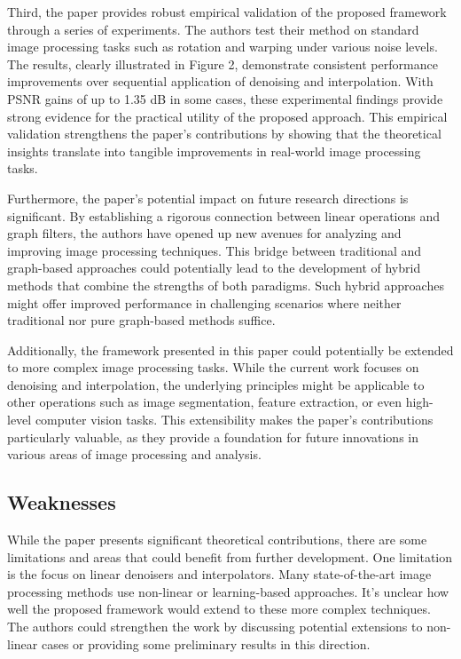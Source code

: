 Third, the paper provides robust empirical validation of the proposed framework through a series of experiments. The authors test their method on standard image processing tasks such as rotation and warping under various noise levels. The results, clearly illustrated in Figure 2, demonstrate consistent performance improvements over sequential application of denoising and interpolation. With PSNR gains of up to 1.35 dB in some cases, these experimental findings provide strong evidence for the practical utility of the proposed approach. This empirical validation strengthens the paper's contributions by showing that the theoretical insights translate into tangible improvements in real-world image processing tasks.

Furthermore, the paper's potential impact on future research directions is significant. By establishing a rigorous connection between linear operations and graph filters, the authors have opened up new avenues for analyzing and improving image processing techniques. This bridge between traditional and graph-based approaches could potentially lead to the development of hybrid methods that combine the strengths of both paradigms. Such hybrid approaches might offer improved performance in challenging scenarios where neither traditional nor pure graph-based methods suffice.

Additionally, the framework presented in this paper could potentially be extended to more complex image processing tasks. While the current work focuses on denoising and interpolation, the underlying principles might be applicable to other operations such as image segmentation, feature extraction, or even high-level computer vision tasks. This extensibility makes the paper's contributions particularly valuable, as they provide a foundation for future innovations in various areas of image processing and analysis.

\subsection{Weaknesses}

While the paper presents significant theoretical contributions, there are some limitations and areas that could benefit from further development. One limitation is the focus on linear denoisers and interpolators. Many state-of-the-art image processing methods use non-linear or learning-based approaches. It's unclear how well the proposed framework would extend to these more complex techniques. The authors could strengthen the work by discussing potential extensions to non-linear cases or providing some preliminary results in this direction.

